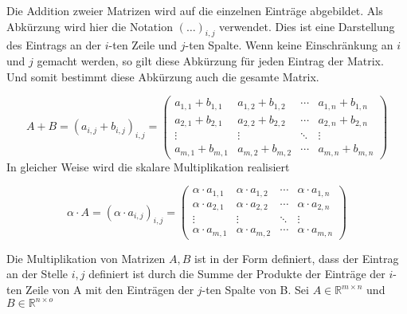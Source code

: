Die Addition zweier Matrizen wird auf die einzelnen Einträge abgebildet. Als Abkürzung wird hier die Notation $(\dots)_{i,j}$ verwendet. Dies ist eine Darstellung des Eintrags an der $i$-ten Zeile und $j$-ten Spalte. Wenn keine Einschränkung an $i$ und $j$ gemacht werden, so gilt diese Abkürzung für jeden Eintrag der Matrix. Und somit bestimmt diese Abkürzung auch die gesamte Matrix.

\begin{equation*}
A + B = \left( a_{i,j} + b_{i,j} \right)_{i,j} = \begin{pmatrix}
a_{1,1}+b_{1,1} & a_{1,2}+b_{1,2} & \cdots & a_{1,n}+b_{1,n} \\
a_{2,1}+b_{2,1} & a_{2,2}+b_{2,2} & \cdots & a_{2,n}+b_{2,n} \\
\vdots & \vdots & \ddots & \vdots \\
a_{m,1}+b_{m,1} & a_{m,2}+b_{m,2} & \cdots & a_{m,n}+b_{m,n}
\end{pmatrix}
\end{equation*}
In gleicher Weise wird die skalare Multiplikation realisiert

\begin{equation*}
\alpha \cdot A = \left( \alpha \cdot a_{i,j} \right)_{i,j} = \begin{pmatrix}
\alpha \cdot a_{1,1} & \alpha \cdot a_{1,2} & \cdots & \alpha \cdot a_{1,n} \\
\alpha \cdot a_{2,1} & \alpha \cdot a_{2,2} & \cdots & \alpha \cdot a_{2,n} \\
\vdots & \vdots & \ddots & \vdots \\
\alpha \cdot a_{m,1} & \alpha \cdot a_{m,2} & \cdots & \alpha \cdot a_{m,n}
\end{pmatrix}
\end{equation*}

Die Multiplikation von Matrizen $A,B$ ist in der Form definiert, dass der Eintrag an der Stelle $i,j$ definiert ist durch die Summe der Produkte der Einträge der $i$-ten Zeile von A mit den Einträgen der $j$-ten Spalte von B. Sei $A\in \mathbb{R}^{m\times n}$ und $B\in \mathbb{R}^{n\times o}$

